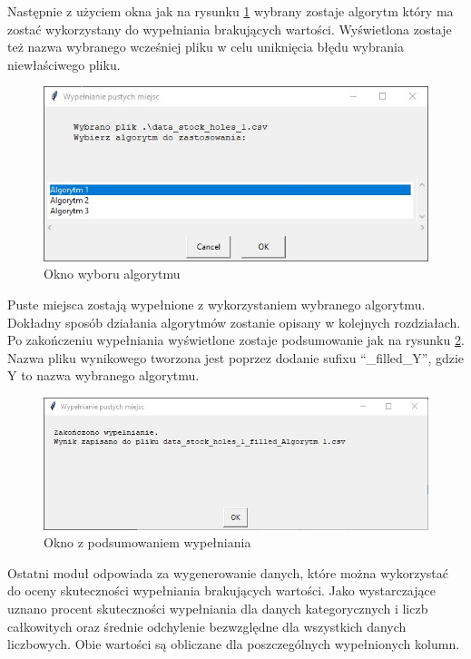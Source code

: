 \documentclass[12pt,twoside]{article}
\begin{document}
Następnie z użyciem okna jak na rysunku \ref{Fig:fill_alg}
wybrany zostaje algorytm który ma zostać wykorzystany do wypełniania brakujących wartości.
Wyświetlona zostaje też nazwa wybranego wcześniej pliku w celu uniknięcia błędu wybrania niewłaściwego pliku.

\begin{figure}[ht]
    \centering
    \includegraphics[width=12cm]{img/06.jpg}
    \caption{Okno wyboru algorytmu}
    \label{Fig:fill_alg}
\end{figure}
\FloatBarrier

Puste miejsca zostają wypełnione z wykorzystaniem wybranego algorytmu.
Dokładny sposób działania algorytmów zostanie opisany w kolejnych rozdziałach.
Po zakończeniu wypełniania wyświetlone zostaje podsumowanie jak na rysunku \ref{Fig:fill_end}.
Nazwa pliku wynikowego tworzona jest poprzez dodanie sufixu ``\_filled\_Y'', gdzie Y to nazwa wybranego algorytmu.

\begin{figure}[ht]
    \centering
    \includegraphics[width=12cm]{img/07.jpg}
    \caption{Okno z podsumowaniem wypełniania}
    \label{Fig:fill_end}
\end{figure}
\FloatBarrier


Ostatni moduł odpowiada za wygenerowanie danych,
które można wykorzystać do oceny skuteczności wypełniania brakujących wartości.
Jako wystarczające uznano procent skuteczności wypełniania dla danych kategorycznych i liczb całkowitych
oraz średnie odchylenie bezwzględne dla wszystkich danych liczbowych.
Obie wartości są obliczane dla poszczególnych wypełnionych kolumn.
\end{document}
